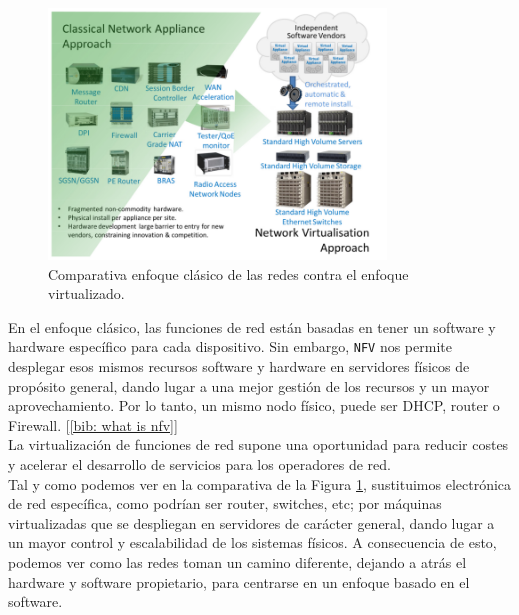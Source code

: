 \documentclass[a4paper, oneside, 12pt]{book}
\begin{document}
	\begin{figure}[h]
		\begin{center}
			\includegraphics[width=0.8\textwidth]{img/classic_network_vs_nfv.png}
			\caption{Comparativa enfoque clásico de las redes contra el enfoque virtualizado.}
			\label{imagen comparativa classic network nfv}
		\end{center}
	\end{figure}
	
	\noindent En el enfoque clásico, las funciones de red están basadas en tener un software y hardware específico para cada dispositivo. Sin embargo, \texttt{NFV} nos permite desplegar esos mismos recursos software y hardware en servidores físicos de propósito general, dando lugar a una mejor gestión de los recursos y un mayor aprovechamiento. Por lo tanto, un mismo nodo físico, puede ser DHCP, router o Firewall. [\ref{bib: what is nfv}]\\

	\noindent La virtualización de funciones de red supone una oportunidad para reducir costes y acelerar el desarrollo de servicios para los operadores de red. \\ 
	
	\noindent Tal y como podemos ver en la comparativa de la Figura \ref{imagen comparativa classic network nfv}, sustituimos electrónica de red específica, como podrían ser router, switches, etc; por máquinas virtualizadas que se despliegan en servidores de carácter general, dando lugar a un mayor control y escalabilidad de los sistemas físicos. A consecuencia de esto, podemos ver como las redes toman un camino diferente, dejando a atrás el hardware y software propietario, para centrarse en un enfoque basado en el software. \\
	
\end{document}

